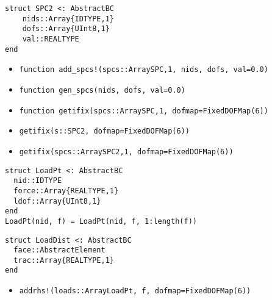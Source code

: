 \documentclass[11pt]{article} %
\begin{document}
\begin{verbatim}
struct SPC2 <: AbstractBC
	nids::Array{IDTYPE,1}
	dofs::Array{UInt8,1}
	val::REALTYPE
end  
\end{verbatim}

\begin{itemize}
\item \texttt{function add\_spcs!(spcs::Array{SPC,1}, nids, dofs, val=0.0)}
\item \texttt{function gen\_spcs(nids, dofs, val=0.0)}
\item \texttt{function getifix(spcs::Array{SPC,1}, dofmap=FixedDOFMap(6))}
\item \texttt{getifix(s::SPC2, dofmap=FixedDOFMap(6))}
\item \texttt{getifix(spcs::Array{SPC2,1}, dofmap=FixedDOFMap(6))}
\end{itemize}

\begin{verbatim}
struct LoadPt <: AbstractBC
  nid::IDTYPE
  force::Array{REALTYPE,1}
  ldof::Array{UInt8,1}
end 
LoadPt(nid, f) = LoadPt(nid, f, 1:length(f))
\end{verbatim}

\begin{verbatim}
struct LoadDist <: AbstractBC
  face::AbstractElement
  trac::Array{REALTYPE,1}
end
\end{verbatim}

\begin{itemize}
\item \texttt{addrhs!(loads::Array{LoadPt}, f, dofmap=FixedDOFMap(6))}
\end{itemize}
\end{document}
